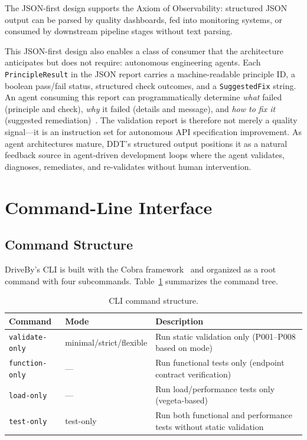 The JSON-first design supports the Axiom of Observability: structured JSON output can be parsed by quality dashboards, fed into monitoring systems, or consumed by downstream pipeline stages without text parsing.

This JSON-first design also enables a class of consumer that the architecture anticipates but does not require: autonomous engineering agents. Each \texttt{PrincipleResult} in the JSON report carries a machine-readable principle ID, a boolean pass/fail status, structured check outcomes, and a \texttt{SuggestedFix} string. An agent consuming this report can programmatically determine \textit{what} failed (principle and check), \textit{why} it failed (details and message), and \textit{how to fix it} (suggested remediation)~\cite{swe-agent}. The validation report is therefore not merely a quality signal---it is an instruction set for autonomous API specification improvement. As agent architectures mature, DDT's structured output positions it as a natural feedback source in agent-driven development loops where the agent validates, diagnoses, remediates, and re-validates without human intervention.

\section{Command-Line Interface}
\label{sec:cli}

\subsection{Command Structure}
\label{subsec:command-structure}

DriveBy's CLI is built with the Cobra framework~\cite{cobra} and organized as a root command with four subcommands. Table~\ref{tab:cli-commands} summarizes the command tree.

\begin{table}[htbp]
\centering
\caption{CLI command structure.}
\label{tab:cli-commands}
\small
\begin{tabular}{@{}llp{5cm}@{}}
\toprule
\textbf{Command} & \textbf{Mode} & \textbf{Description} \\
\midrule
\texttt{validate-only} & minimal/strict/flexible & Run static validation only (P001--P008 based on mode) \\
\texttt{function-only}  & --- & Run functional tests only (endpoint contract verification) \\
\texttt{load-only}     & --- & Run load/performance tests only (vegeta-based) \\
\texttt{test-only}     & test-only & Run both functional and performance tests without static validation \\
\bottomrule
\end{tabular}
\end{table}

